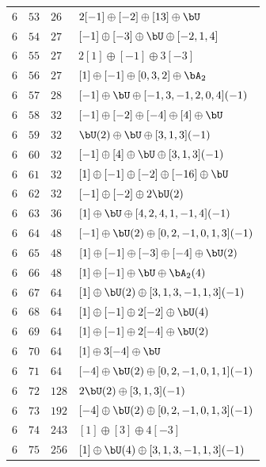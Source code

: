 \begin{center}
\begin{longtable}{llll}
 \(6\) & \(53\) & \(26\) & \(2 [-1] \oplus [-2] \oplus [13] \oplus \bU\) \\
 \(6\) & \(54\) & \(27\) & \([-1] \oplus [-3] \oplus \bU \oplus [-2, 1, 4]\) \\
 \(6\) & \(55\) & \(27\) & \(2[1] \oplus [-1] \oplus 3 [-3] \) \\
 \(6\) & \(56\) & \(27\) & \([1] \oplus [-1] \oplus [0, 3, 2] \oplus \bA_{2}\) \\
 \(6\) & \(57\) & \(28\) & \([-1] \oplus \bU \oplus [-1, 3, -1, 2, 0, 4](-1)\) \\
 \(6\) & \(58\) & \(32\) & \([-1] \oplus [-2] \oplus [-4] \oplus [4] \oplus \bU\) \\
 \(6\) & \(59\) & \(32\) & \(\bU(2) \oplus \bU \oplus [3, 1, 3](-1)\) \\
 \(6\) & \(60\) & \(32\) & \([-1] \oplus [4] \oplus \bU \oplus [3, 1, 3](-1)\) \\
 \(6\) & \(61\) & \(32\) & \([1] \oplus [-1] \oplus [-2] \oplus [-16] \oplus \bU\) \\
 \(6\) & \(62\) & \(32\) & \([-1] \oplus [-2] \oplus 2 \bU(2)\) \\
 \(6\) & \(63\) & \(36\) & \([1] \oplus \bU \oplus [4, 2, 4, 1, -1, 4](-1)\) \\
 \(6\) & \(64\) & \(48\) & \([-1] \oplus \bU(2) \oplus [0, 2, -1, 0, 1, 3](-1)\) \\
 \(6\) & \(65\) & \(48\) & \([1] \oplus [-1] \oplus [-3] \oplus [-4] \oplus \bU(2)\) \\
 \(6\) & \(66\) & \(48\) & \([1] \oplus [-1] \oplus \bU \oplus \bA_{2}(4)\) \\
 \(6\) & \(67\) & \(64\) & \([1] \oplus \bU(2) \oplus [3, 1, 3, -1, 1, 3](-1)\) \\
 \(6\) & \(68\) & \(64\) & \([1] \oplus [-1] \oplus 2 [-2] \oplus \bU(4)\) \\
 \(6\) & \(69\) & \(64\) & \([1] \oplus [-1] \oplus 2 [-4] \oplus \bU(2)\) \\
 \(6\) & \(70\) & \(64\) & \([1] \oplus 3 [-4] \oplus \bU\) \\
 \(6\) & \(71\) & \(64\) & \([-4] \oplus \bU(2) \oplus [0, 2, -1, 0, 1, 1](-1)\) \\
 \(6\) & \(72\) & \(128\) & \(2 \bU(2) \oplus [3, 1, 3](-1)\) \\
 \(6\) & \(73\) & \(192\) & \([-4] \oplus \bU(2) \oplus [0, 2, -1, 0, 1, 3](-1)\) \\
 \(6\) & \(74\) & \(243\) & \([1] \oplus [3] \oplus 4 [-3]\) \\
 \(6\) & \(75\) & \(256\) & \([1] \oplus \bU(4) \oplus [3, 1, 3, -1, 1, 3](-1)\) \\

\end{longtable}
\end{center}
